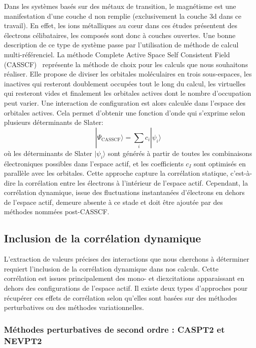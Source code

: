 \documentclass[12pt,a4paper]{report}
\numberwithin{equation}{section}
\begin{document}
Dans les systèmes basés sur des métaux de transition, le magnétisme est une manifestation d'une couche d non remplie (exclusivement la couche 3d dans ce travail).
En effet, les ions métalliques au c\oe ur dans ces études présentent des électrons célibataires, les composés sont donc à couches ouvertes.
Une bonne description de ce type de système passe par l'utilisation de méthode de calcul multi-référenciel.
La méthode Complete Active Space Self Consistent Field (CASSCF)~\cite{roos_complete_1980} représente la méthode de choix pour les calculs que nous souhaitons réaliser.
Elle propose de diviser les orbitales moléculaires en trois sous-espaces, les inactives qui resteront doublement occupées tout le long du calcul, les virtuelles qui resteront vides et finalement les orbitales actives dont le nombre d'occupation peut varier.
Une interaction de configuration est alors calculée dans l'espace des orbitales actives.
Cela permet d'obtenir une fonction d'onde qui s'exprime selon plusieurs déterminants de Slater:
\begin{equation}
|\Psi_{\mathrm{CASSCF}}\rangle = \sum_i c_i | \psi_i \rangle
\end{equation}
où les déterminants de Slater \(|\psi_i\rangle\) sont générés à partir de toutes les combinaisons électroniques possibles dans l’espace actif, et les coefficients \(c_I\) sont optimisés en parallèle avec les orbitales.  
Cette approche capture la corrélation statique, c’est-à-dire la corrélation entre les électrons à l'intérieur de l'espace actif.  
Cependant, la corrélation dynamique, issue des fluctuations instantanées d’électrons en dehors de l’espace actif, demeure absente à ce stade et doit être ajoutée par des méthodes nommées post-CASSCF.

\subsection*{Inclusion de la corrélation dynamique}

L'extraction de valeurs précises des interactions que nous cherchons à déterminer requiert l'inclusion de la corrélation dynamique dans nos calculs.
Cette corrélation est issues principalement des mono- et diexcitations apparaissant en dehors des configurations de l'espace actif.
Il existe deux types d'approches pour récupérer ces effets de corrélation selon qu'elles sont basées sur des méthodes perturbatives ou des méthodes variationnelles.

\subsubsection*{ Méthodes perturbatives de second ordre : CASPT2 et NEVPT2}
\end{document}
